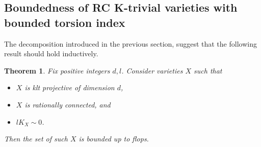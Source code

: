 \documentclass[11pt]{ip-journal}
\newtheorem{theorem}{Theorem}[section]
\theoremstyle{definition}
\begin{document}
\subsection{Boundedness of RC K-trivial varieties with bounded torsion index}
\label{bound.rc.cy.sect}
The decomposition introduced in the previous section, suggest that the following result should hold inductively.

\begin{theorem}
\label{rc.cy.log.bound.thm}
Fix positive integers $d, l$.
Consider varieties $X$ such that
\begin{itemize}
    \item $X$ is klt projective of dimension $d$, 
    \item $X$ is rationally connected, and
    \item $lK_X \sim 0$.
\end{itemize}
Then the set of such $X$ is bounded up to flops.
\end{theorem}
\end{document}
